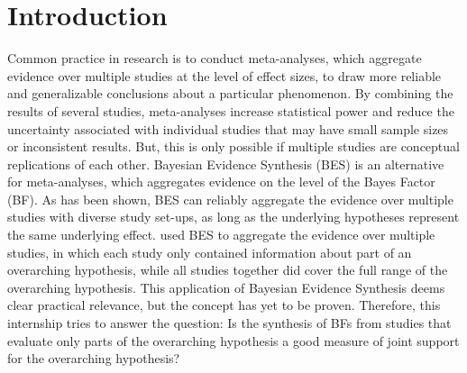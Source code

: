 \documentclass[12pt]{article}
\begin{document}
\section{Introduction}
Common practice in research is to conduct meta-analyses, which aggregate evidence over multiple studies at the level of effect sizes, to draw more reliable and generalizable conclusions about a particular phenomenon. By combining the results of several studies, meta-analyses increase statistical power and reduce the uncertainty associated with individual studies that may have small sample sizes or inconsistent results. But, this is only possible if multiple studies are conceptual replications of each other. Bayesian Evidence Synthesis (BES) is an alternative for meta-analyses, which aggregates evidence on the level of the Bayes Factor (BF). As has been shown, BES can reliably aggregate the evidence over multiple studies with diverse study set-ups, as long as the underlying hypotheses represent the same underlying effect. \citet{kevenaar_bayesian_2021} used BES to aggregate the evidence over multiple studies, in which each study only contained information about part of an overarching hypothesis, while all studies together did cover the full range of the overarching hypothesis. This application of Bayesian Evidence Synthesis deems clear practical relevance, but the concept has yet to be proven. Therefore, this internship tries to answer the question: Is the synthesis of BFs from studies that evaluate only parts of the overarching hypothesis a good measure of joint support for the overarching hypothesis?
\end{document}

